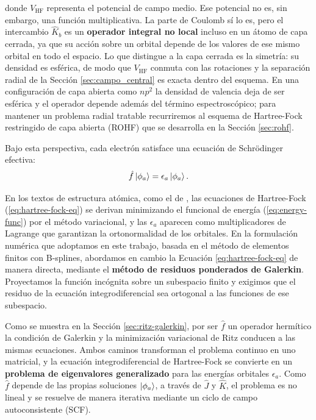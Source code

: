 donde $V_{\text{HF}}$ representa el potencial de campo medio. Ese potencial no es, sin embargo, una función multiplicativa. La parte de Coulomb sí lo es, pero el intercambio $\hat{K}_b$ es un \textbf{operador integral no local} incluso en un átomo de capa cerrada, ya que su acción sobre un orbital depende de los valores de ese mismo orbital en todo el espacio. Lo que distingue a la capa cerrada es la simetría: su densidad es esférica, de modo que $V_{\text{HF}}$ conmuta con las rotaciones y la separación radial de la Sección \ref{sec:campo_central} es exacta dentro del esquema. En una configuración de capa abierta como $np^2$ la densidad de valencia deja de ser esférica y el operador depende además del término espectroscópico; para mantener un problema radial tratable recurriremos al esquema de Hartree-Fock restringido de capa abierta (ROHF) que se desarrolla en la Sección \ref{sec:rohf}.

Bajo esta perspectiva, cada electrón satisface una ecuación de Schrödinger efectiva:
\begin{equation}
  \label{eq:hartree-fock-eq}
  \hat{f} \ket{\phi_a} = \epsilon_a \ket{\phi_a}.
\end{equation}

En los textos de estructura atómica, como el de \textcite[Capítulo 7]{Cowan1981}, las ecuaciones de Hartree-Fock (\ref{eq:hartree-fock-eq}) se derivan minimizando el funcional de energía (\ref{eq:energy-func}) por el método variacional, y las $\epsilon_a$ aparecen como multiplicadores de Lagrange que garantizan la ortonormalidad de los orbitales. En la formulación numérica que adoptamos en este trabajo, basada en el método de elementos finitos con B-splines, abordamos en cambio la Ecuación \ref{eq:hartree-fock-eq} de manera directa, mediante el \textbf{método de residuos ponderados de Galerkin}. Proyectamos la función incógnita sobre un subespacio finito y exigimos que el residuo de la ecuación integrodiferencial sea ortogonal a las funciones de ese subespacio.

Como se muestra en la Sección \ref{sec:ritz-galerkin}, por ser $\hat{f}$ un operador hermítico la condición de Galerkin y la minimización variacional de Ritz conducen a las mismas ecuaciones. Ambos caminos transforman el problema continuo en uno matricial, y la ecuación integrodiferencial de Hartree-Fock se convierte en un \textbf{problema de eigenvalores generalizado} para las energías orbitales $\epsilon_a$. Como $\hat{f}$ depende de las propias soluciones $\ket{\phi_a}$, a través de $\hat{J}$ y $\hat{K}$, el problema es no lineal y se resuelve de manera iterativa mediante un ciclo de campo autoconsistente (SCF).

